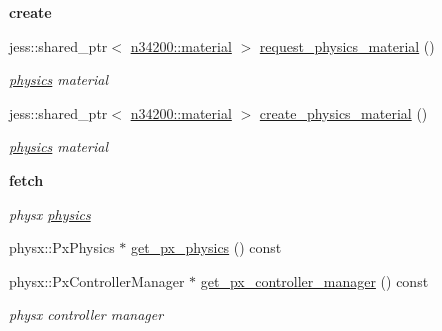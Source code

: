 \begin{Indent}{\bf create}
\begin{DoxyCompactItemize}
jess::shared\_\-ptr$<$ \hyperlink{classnebula_1_1content_1_1actor_1_1physics_1_1material}{n34200::material} $>$ \hyperlink{classnebula_1_1content_1_1physics_1_1base_a6ee919f3584ddf99cc096e111540923d}{request\_\-physics\_\-material} ()
\begin{DoxyCompactList}\small\item\em \hyperlink{namespacenebula_1_1content_1_1physics}{physics} material \item\end{DoxyCompactList}\item 
jess::shared\_\-ptr$<$ \hyperlink{classnebula_1_1content_1_1actor_1_1physics_1_1material}{n34200::material} $>$ \hyperlink{classnebula_1_1content_1_1physics_1_1base_a6c7e79271697c678c8634a5e5dbe976e}{create\_\-physics\_\-material} ()
\begin{DoxyCompactList}\small\item\em \hyperlink{namespacenebula_1_1content_1_1physics}{physics} material \item\end{DoxyCompactList}\end{DoxyCompactItemize}
\end{Indent}
\begin{Indent}{\bf fetch}\par
{\em \label{_amgrp5374034a40c8d6800cb4f449c2ea00a0}
 physx \hyperlink{namespacenebula_1_1content_1_1physics}{physics} }\begin{DoxyCompactItemize}
\item 
physx::PxPhysics $\ast$ \hyperlink{classnebula_1_1content_1_1physics_1_1base_abc804c1786fe0ce0044e33d4d5394738}{get\_\-px\_\-physics} () const 
\item 
physx::PxControllerManager $\ast$ \hyperlink{classnebula_1_1content_1_1physics_1_1base_a57ac03fda506751b4062aa75bb6dc33f}{get\_\-px\_\-controller\_\-manager} () const 
\begin{DoxyCompactList}\small\item\em physx controller manager \item\end{DoxyCompactList}\end{DoxyCompactItemize}
\end{Indent}
